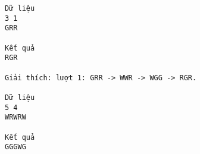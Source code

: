 \begin{verbatim}
Dữ liệu
3 1
GRR

Kết quả 
RGR

Giải thích: lượt 1: GRR -> WWR -> WGG -> RGR.

Dữ liệu
5 4
WRWRW

Kết quả 
GGGWG
\end{verbatim}